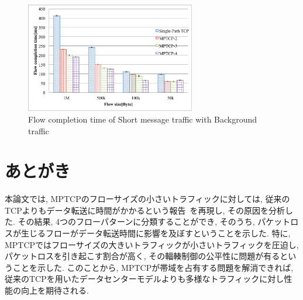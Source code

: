 \documentclass[10pt, a4paper, twocolumn]{jsarticle}
\begin{document}
\begin{figure}[h]
    \begin{center}
    \includegraphics[autoebb, width=210pt]{./img/mix_short.pdf}
    \caption{Flow completion time  of Short message traffic with Background
    traffic}
    \label{fig:short_query}
    \end{center}
\end{figure}


%
%

\section{あとがき}
\label{sec:conclude}
本論文では, MPTCPのフローサイズの小さいトラフィックに対しては,
従来のTCPよりもデータ転送に時間がかかるという報告~\cite{improving}を再現し, その原因を分析した.
その結果, 4つのフローパターンに分類することができ, そのうち, パケットロスが生じるフローがデータ転送時間に影響を及ぼすということを示した.
特に, MPTCPではフローサイズの大きいトラフィックが小さいトラフィックを圧迫し, パケットロスを引き起こす割合が高く,
その輻輳制御の公平性に問題が有るということを示した.
このことから, MPTCPが帯域を占有する問題を解消できれば, 従来のTCPを用いたデータセンターモデルよりも多様なトラフィックに対し性能の向上を期待される.
\end{document}
